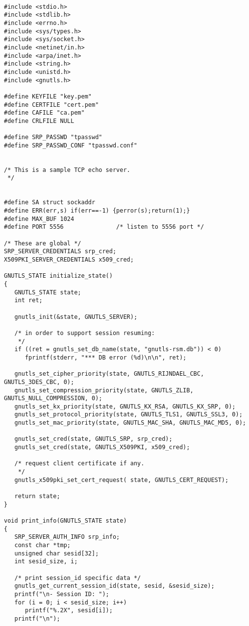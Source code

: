 \begin{verbatim}

#include <stdio.h>
#include <stdlib.h>
#include <errno.h>
#include <sys/types.h>
#include <sys/socket.h>
#include <netinet/in.h>
#include <arpa/inet.h>
#include <string.h>
#include <unistd.h>
#include <gnutls.h>

#define KEYFILE "key.pem"
#define CERTFILE "cert.pem"
#define CAFILE "ca.pem"
#define CRLFILE NULL

#define SRP_PASSWD "tpasswd"
#define SRP_PASSWD_CONF "tpasswd.conf"


/* This is a sample TCP echo server.
 */


#define SA struct sockaddr
#define ERR(err,s) if(err==-1) {perror(s);return(1);}
#define MAX_BUF 1024
#define PORT 5556               /* listen to 5556 port */

/* These are global */
SRP_SERVER_CREDENTIALS srp_cred;
X509PKI_SERVER_CREDENTIALS x509_cred;

GNUTLS_STATE initialize_state()
{
   GNUTLS_STATE state;
   int ret;

   gnutls_init(&state, GNUTLS_SERVER);

   /* in order to support session resuming:
    */
   if ((ret = gnutls_set_db_name(state, "gnutls-rsm.db")) < 0)
      fprintf(stderr, "*** DB error (%d)\n\n", ret);

   gnutls_set_cipher_priority(state, GNUTLS_RIJNDAEL_CBC, GNUTLS_3DES_CBC, 0);
   gnutls_set_compression_priority(state, GNUTLS_ZLIB, GNUTLS_NULL_COMPRESSION, 0);
   gnutls_set_kx_priority(state, GNUTLS_KX_RSA, GNUTLS_KX_SRP, 0);
   gnutls_set_protocol_priority(state, GNUTLS_TLS1, GNUTLS_SSL3, 0);
   gnutls_set_mac_priority(state, GNUTLS_MAC_SHA, GNUTLS_MAC_MD5, 0);

   gnutls_set_cred(state, GNUTLS_SRP, srp_cred);
   gnutls_set_cred(state, GNUTLS_X509PKI, x509_cred);

   /* request client certificate if any.
    */
   gnutls_x509pki_set_cert_request( state, GNUTLS_CERT_REQUEST);
   
   return state;
}

void print_info(GNUTLS_STATE state)
{
   SRP_SERVER_AUTH_INFO srp_info;
   const char *tmp;
   unsigned char sesid[32];
   int sesid_size, i;

   /* print session_id specific data */
   gnutls_get_current_session_id(state, sesid, &sesid_size);
   printf("\n- Session ID: ");
   for (i = 0; i < sesid_size; i++)
      printf("%.2X", sesid[i]);
   printf("\n");


\end{verbatim}
